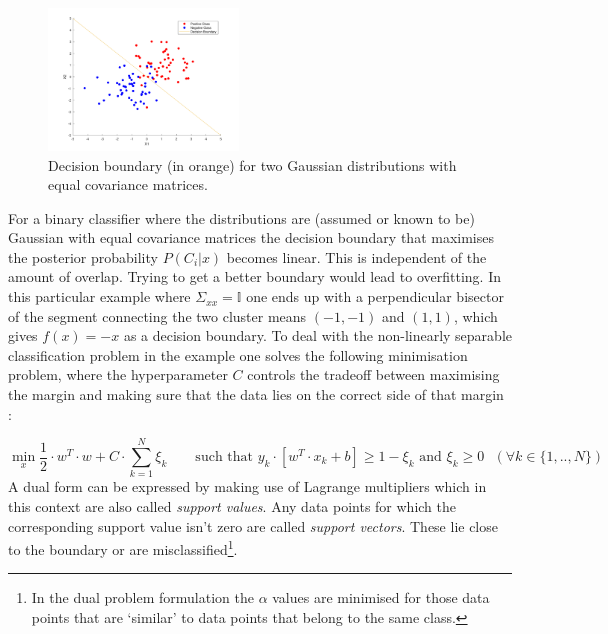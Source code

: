 
\begingroup
\setlength{\columnsep}{0.5cm}
\setlength{\intextsep}{0.5cm}
\begin{figure}
\includegraphics[width=0.45\textwidth]{../src/figures/twogaussians.pdf}
\caption{Decision boundary (in orange) for two Gaussian distributions with equal covariance matrices.}
\label{twogaussians}
\end{figure}
For a binary classifier where the distributions are (assumed or known to be) Gaussian with equal covariance matrices the decision boundary that maximises the posterior probability $P(C_i|x)$ becomes linear. This is independent of the amount of overlap. Trying to get a better boundary would lead to overfitting. In this particular example where $\Sigma_{xx}=\mathbb{I}$ one ends up with a perpendicular bisector of the segment connecting the two cluster means 
$(-1,-1)$ and $(1,1)$, which gives $f(x)=-x$ as a decision boundary.
To deal with the non-linearly separable classification problem in the example one solves the following minimisation problem, where the hyperparameter $C$ controls the tradeoff between maximising the margin and making sure that the data lies on the correct side of that margin :

\endgroup
\vspace{-0.5cm}
$$\min_x\frac{1}{2}\cdot w^T\cdot w+C\cdot \sum_{k=1}^N\xi_k\qquad\text{such that $y_k\cdot[w^T\cdot x_k+b]\geq 1-\xi_k$ and $\xi_k\geq 0$ $(\forall k\in\{1,..,N\})$}$$
A dual form can be expressed by making use of Lagrange multipliers which in this context are also called \textit{support values}. Any data points for which the corresponding support value isn't zero are called \textit{support vectors}. These lie close to the boundary or are misclassified\footnote{In the dual problem formulation the $\alpha$ values are minimised for those data points that are `similar' to data points that belong to the same class.}.

